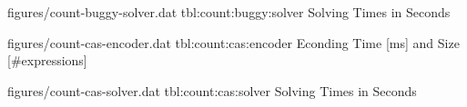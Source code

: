 
\SolverStatsTable
  {figures/count-buggy-solver.dat}
  {tbl:count:buggy:solver}
  {Solving Times in Seconds}

\newpage


\EncoderStatsTable
  {figures/count-cas-encoder.dat}
  {tbl:count:cas:encoder}
  {Econding Time [ms] and Size [\#expressions]}


\SolverStatsTable
  {figures/count-cas-solver.dat}
  {tbl:count:cas:solver}
  {Solving Times in Seconds}

